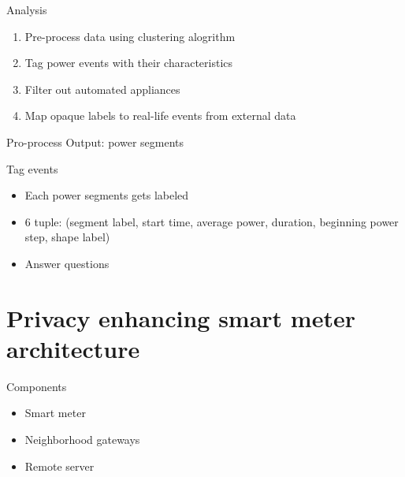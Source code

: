 \documentclass[10pt]{beamer}
\begin{document}
\begin{frame}{Analysis}
  \begin{enumerate}
    \itemsep2em 
  \item Pre-process data using clustering alogrithm
  \item Tag power events with their characteristics
  \item Filter out automated appliances
  \item Map opaque labels to real-life events from external data
  \end{enumerate}
\end{frame}

\begin{frame}{Pro-process}
  Output: power segments
\end{frame}

\begin{frame}{Tag events}
  \begin{itemize}
  \item Each power segments gets labeled
  \item 6 tuple: (segment label, start time, average power, duration, beginning power step, shape label)
  \item Answer questions
  \end{itemize}
\end{frame}

\section{Privacy enhancing smart meter architecture}
\begin{frame}{Components}
  \begin{itemize}
  \item Smart meter
  \item Neighborhood gateways
  \item Remote server
  \end{itemize}
  
\end{frame}

{\aauwavesbg
\begin{frame}
\end{frame}}
\end{document}
